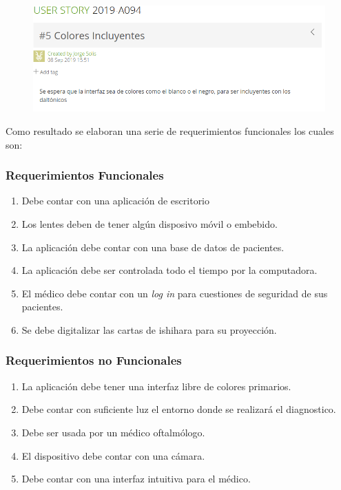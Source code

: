 \documentclass[10pt]{article}
\begin{document}
\begin{figure}[H]
	\begin{center}
\includegraphics[scale = 0.55]{HS/US5.png}
	\end{center} 
\end{figure}

Como resultado se elaboran una serie de requerimientos funcionales los cuales son:
\subsubsection{Requerimientos Funcionales}

\begin{enumerate}
    \item Debe contar con una aplicación de escritorio
    \item Los lentes deben de tener algún disposivo móvil o embebido.
    \item La aplicación debe contar con una base de datos de pacientes.
    \item La aplicación debe ser controlada todo el tiempo por la computadora.
    \item El médico debe contar con un \textit{log in} para cuestiones de seguridad de sus pacientes.
    \item Se debe digitalizar las cartas de ishihara para su proyección.
    
\end{enumerate}

\subsubsection{Requerimientos no Funcionales}

\begin{enumerate}
    \item La aplicación debe tener una interfaz libre de colores primarios.
    \item Debe contar con suficiente luz el entorno donde se realizará el diagnostico.
    \item Debe ser usada por un médico oftalmólogo.
    \item El dispositivo debe contar con una cámara.
    \item Debe contar con una interfaz intuitiva para el médico.
    
\end{enumerate}
\end{document}
